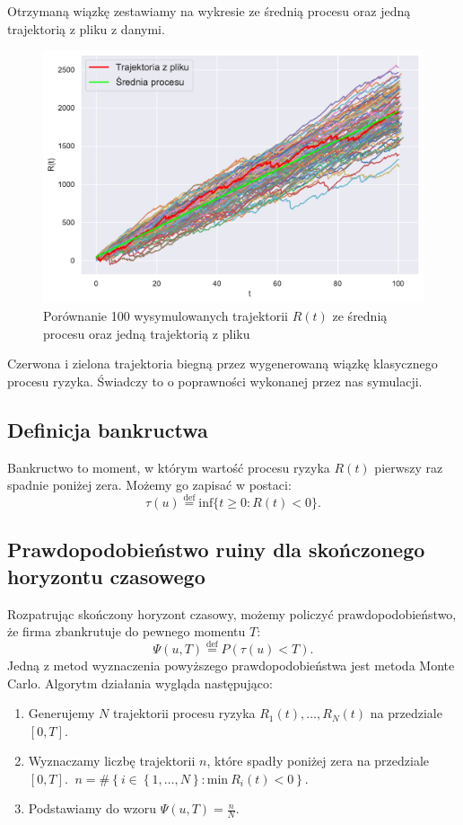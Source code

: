 \documentclass[12pt]{mwart}
\begin{document}
	\noindent Otrzymaną wiązkę zestawiamy na wykresie ze średnią procesu oraz jedną trajektorią z pliku z danymi.
	
	\begin{figure}[H]
	\begin{center}
		\includegraphics[scale=0.5]{symulacja1.pdf}
		\caption{Porównanie 100 wysymulowanych trajektorii $R(t)$ ze średnią procesu oraz jedną trajektorią z pliku}
	\end{center}
	\end{figure}
	
	\noindent Czerwona i zielona trajektoria biegną przez wygenerowaną wiązkę klasycznego procesu ryzyka. Świadczy to o poprawności wykonanej przez nas symulacji.
	
	
	
	\subsection{Definicja bankructwa}
	\noindent Bankructwo to moment, w którym wartość procesu ryzyka $R(t)$ pierwszy raz spadnie poniżej zera. Możemy go zapisać w postaci:
	$$\tau(u) \overset{\mathrm{def}}{=} \text{inf} \{t \geq 0: R(t) <0\}.$$
	
	
	\subsection{Prawdopodobieństwo ruiny dla skończonego horyzontu czasowego}
	\noindent Rozpatrując skończony horyzont czasowy, możemy policzyć prawdopodobieństwo, że firma zbankrutuje do pewnego momentu $T$:
	$$\Psi (u,T) \overset{\mathrm{def}}{=} P \left(   \tau (u) < T \right) .
	$$
	\noindent Jedną z metod wyznaczenia powyższego prawdopodobieństwa jest metoda Monte Carlo. Algorytm działania wygląda następująco:
	\begin{enumerate}
	\itemsep 2mm
		\item Generujemy $N$ trajektorii procesu ryzyka $R_1(t), \ldots , R_N(t)$ na przedziale $[0,T]$.
		\item Wyznaczamy liczbę trajektorii $n$, które spadły poniżej zera na przedziale $[0,T]$. $\ n=\#\left\lbrace i \in \left\lbrace 1, \dots , N \right\rbrace \colon \mathrm{min}\ R_i(t) < 0 \right\rbrace $. 
		\item Podstawiamy do wzoru $\Psi (u,T)=\frac{n}{N}$. \\
	\end{enumerate}
	
\end{document}
